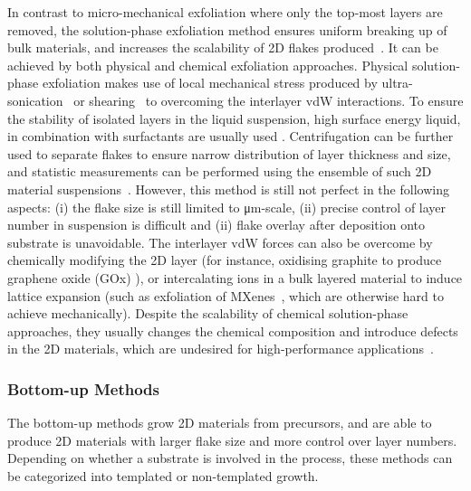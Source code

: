 In contrast to micro-mechanical exfoliation where only the top-most
layers are removed, the solution-phase exfoliation method ensures
uniform breaking up of bulk materials, and increases the scalability
of 2D flakes produced~\cite{Coleman_2012_rev}.
It can be achieved by
both physical and chemical exfoliation approaches.
%
Physical solution-phase exfoliation makes use of local mechanical
stress produced by ultra-sonication~\cite{Xia_2013_liquidphase}
or shearing~\cite{Paton_2014_shearing} to overcoming the interlayer
vdW interactions. To ensure the stability of isolated layers in the
liquid suspension, high surface energy liquid, in combination with
surfactants are usually used
\cite{Coleman_2012_rev,Paton_2014_shearing,Hanlon_2015_shear,Backes_2014_mos2,Shih_2010_exf,Shih_2011_bitri}.
%
Centrifugation can be further used to separate flakes to ensure narrow
distribution of layer thickness and size, and statistic measurements
can be performed using the ensemble of such 2D material
suspensions~\cite{Backes_2014_mos2}.
%
However, this method is still not perfect in the following aspects:
(i) the flake size is still limited to μm-scale, (ii) precise control
of layer number in suspension is difficult and (ii) flake overlay
after deposition onto substrate is unavoidable.
%
The interlayer vdW forces can also be overcome by chemically modifying
the 2D layer (for instance, oxidising graphite to produce graphene
oxide (GOx) \cite{Chen_2013_GO}), or intercalating ions in a bulk
layered material to induce lattice expansion (such as exfoliation of
MXenes~\cite{Naguib_2011_Mxene}, which are otherwise hard to achieve
mechanically). Despite the scalability of chemical solution-phase
approaches, they usually changes the chemical composition and
introduce defects in the 2D materials, which are undesired for
high-performance applications~\cite{Lin_2019_gr_rev_growth}.

\subsubsection{Bottom-up Methods}
\label{sec:bottom-up-methods}

The bottom-up methods grow 2D materials from precursors, and are able
to produce 2D materials with larger flake size and more control over
layer numbers.
%
Depending on whether a substrate is involved in the
process, these methods can be categorized into templated or
non-templated growth.


